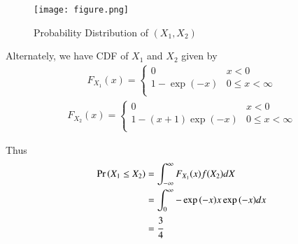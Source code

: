 \documentclass[journal,12pt,twocolumn]{IEEEtran}
\begin{document}
\begin{figure}[!ht]
\centering
\texttt{[image: figure.png]}
\caption{Probability Distribution of $(X_1, X_2)$}
\end{figure}

Alternately, we have CDF of $X_1$ and $X_2$ given by 
\begin{align}
    F_{X_1}(x) = 
    \begin{cases}
     0   & x < 0\\
    1-\exp{(-x)} & 0\le x < \infty\\
    \end{cases}
\end{align}
\begin{align}
    F_{X_2}(x) = 
    \begin{cases}
    0   & x < 0\\
    1-(x+1)\exp{(-x)} & 0\le x < \infty\\
    \end{cases}
\end{align}

Thus 
\begin{align}
    \Pr\left(X_1\le X_2\right) &= \int_{-\infty}^{\infty} F_{X_1}(x)f(X_2)dX\\
                &= \int_0^\infty -\exp{(-x)}x\exp{(-x)}dx\\
                &= \cfrac{3}{4}
\end{align}
\end{document}
